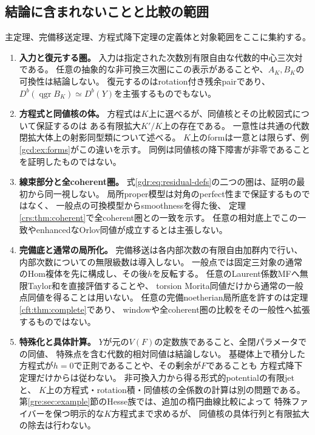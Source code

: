 \subsection{結論に含まれないことと比較の範囲}\label{gdr:subsec:scope}
主定理、完備移送定理、方程式降下定理の定義体と対象範囲をここに集約する。
\begin{enumerate}[label=(\arabic*)]
\item \textbf{入力と復元する圏。}
入力は指定された次数別有限自由な代数的中心三次対である。
任意の抽象的な非可換三次圏にこの表示があることや、$A_K,B_K$の可換性は結論しない。
復元するのはrotation付き残余pairであり、
$D^b(\operatorname{qgr}B_K)\simeq D^b(Y)$を主張するものでもない。
\item \textbf{方程式と同値核の体。}
方程式は$K$上に選べるが、同値核とその比較図式について保証するのは
ある有限拡大$K'/K$上の存在である。
一意性は共通の代数閉拡大体上の射影同型類について述べる。
$K$上のformは一意とは限らず、例\ref{gcd:ex:forms}がこの違いを示す。
同例は同値核の降下障害が非零であることを証明したものではない。
\item \textbf{線束部分と全coherent圏。}
式\eqref{gdr:eq:residual-defs}の二つの圏は、証明の最初から同一視しない。
局所proper模型は対角のperfect性まで保証するものではなく、
一般点の可換模型からsmoothnessを得た後、
定理\ref{crs:thm:coherent}で全coherent圏との一致を示す。
任意の相対底上でこの一致やenhancedなOrlov同値が成立するとは主張しない。
\item \textbf{完備底と通常の局所化。}
完備移送は各内部次数の有限自由加群内で行い、内部次数についての無限級数は導入しない。
一般点では固定三対象の通常のHom複体を先に構成し、その後$h$を反転する。
任意のLaurent係数MFへ無限Taylor和を直接評価することや、
torsion Morita同値だけから通常の一般点同値を得ることは用いない。
任意の完備noetherian局所底を許すのは定理\ref{cft:thm:complete}であり、
windowや全coherent圏の比較をその一般性へ拡張するものではない。
\item \textbf{特殊化と具体計算。}
$Y$が元の$V(F)$の定数族であること、全閉パラメータでの同値、
特殊点を含む代数的相対同値は結論しない。
基礎体上で積分した方程式が$h=0$で正則であることや、その剰余が$F$であることも
方程式降下定理だけからは従わない。
非可換入力から得る形式的potentialの有限jetと、
$K$上の方程式・rotation積・同値核の全係数の計算は別の問題である。
第\ref{gre:sec:example}節のHesse族では、追加の楕円曲線比較によって
特殊ファイバーを保つ明示的な$K$方程式まで求めるが、
同値核の具体行列と有限拡大の除去は行わない。
\end{enumerate}
